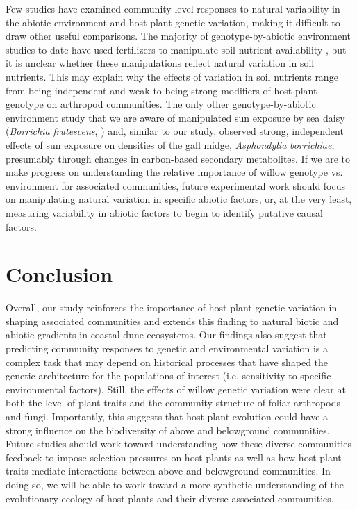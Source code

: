\documentclass[11pt]{article}
\begin{document}
Few studies have examined community-level responses to natural
variability in the abiotic environment and host-plant genetic variation,
making it difficult to draw other useful comparisons. The majority of
genotype-by-abiotic environment studies to date have used fertilizers to
manipulate soil nutrient availability
\cite{Abdala_Roberts_2012a}\cite{Orians_1996}\cite{Rossi_1998}, but it is unclear
whether these manipulations reflect natural variation in soil nutrients.
This may explain why the effects of variation in soil nutrients range
from being independent and weak \cite{Abdala_Roberts_2012a} to being strong
modifiers \cite{Orians_1996} of host-plant genotype on arthropod
communities. The only other genotype-by-abiotic environment study that
we are aware of manipulated sun exposure by sea daisy (\emph{Borrichia}
\emph{frutescens}, \cite{Rossi_1998}) and, similar to our study,
observed strong, independent effects of sun exposure on densities of the
gall midge, \emph{Asphondylia} \emph{borrichiae}, presumably through
changes in carbon-based secondary metabolites. If we are to make
progress on understanding the relative importance of willow genotype vs.
environment for associated communities, future experimental work should
focus on manipulating natural variation in specific abiotic factors, or,
at the very least, measuring variability in abiotic factors to begin to
identify putative causal factors.

\section*{Conclusion}

Overall, our study reinforces the importance of host-plant genetic
variation in shaping associated communities and extends this finding to
natural biotic and abiotic gradients in coastal dune ecosystems. Our
findings also suggest that predicting community responses to genetic and
environmental variation is a complex task that may depend on historical
processes that have shaped the genetic architecture for the populations
of interest (i.e. sensitivity to specific environmental factors). Still,
the effects of willow genetic variation were clear at both the level of
plant traits and the community structure of foliar arthropods and fungi.
Importantly, this suggests that host-plant evolution could have a strong
influence on the biodiversity of above and belowground communities.
Future studies should work toward understanding how these diverse
communities feedback to impose selection pressures on host plants as
well as how host-plant traits mediate interactions between above and
belowground communities. In doing so, we will be able to work toward a
more synthetic understanding of the evolutionary ecology of host plants
and their diverse associated communities.
\end{document}
